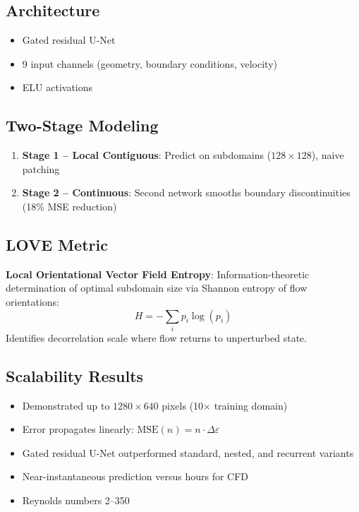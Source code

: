 \subsection{Architecture}
\begin{itemize}
    \item Gated residual U-Net
    \item 9 input channels (geometry, boundary conditions, velocity)
    \item ELU activations
\end{itemize}

\subsection{Two-Stage Modeling}
\begin{enumerate}
    \item \textbf{Stage 1 -- Local Contiguous}: Predict on subdomains ($128 \times 128$), naive patching
    \item \textbf{Stage 2 -- Continuous}: Second network smooths boundary discontinuities (18\% MSE reduction)
\end{enumerate}

\subsection{LOVE Metric}
\textbf{Local Orientational Vector Field Entropy}: Information-theoretic determination of optimal subdomain size via Shannon entropy of flow orientations:
\begin{equation}
H = -\sum_i p_i \log(p_i)
\end{equation}
Identifies decorrelation scale where flow returns to unperturbed state.

\subsection{Scalability Results}
\begin{itemize}
    \item Demonstrated up to $1280 \times 640$ pixels (10$\times$ training domain)
    \item Error propagates linearly: $\text{MSE}(n) = n \cdot \Delta\varepsilon$
    \item Gated residual U-Net outperformed standard, nested, and recurrent variants
    \item Near-instantaneous prediction versus hours for CFD
    \item Reynolds numbers 2--350
\end{itemize}

